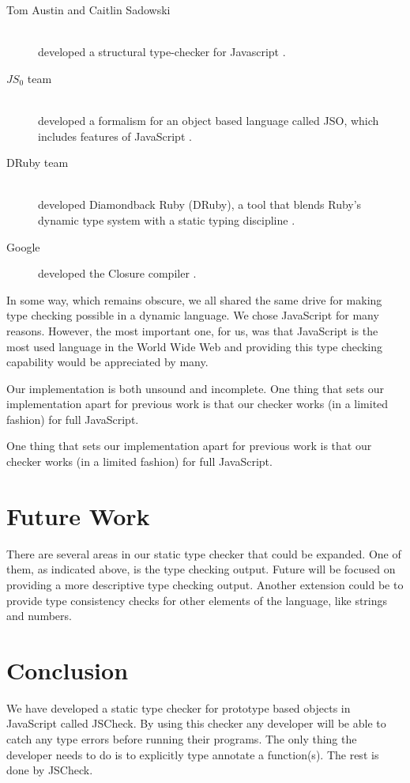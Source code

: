 \documentclass{article}
\begin{document}
\begin{description}
  \item[Tom Austin and Caitlin Sadowski] \hfill \\ 
  developed a structural type-checker for Javascript \cite{fwjsStruct}.
  \item[$JS_0$ team] \hfill \\ 
  developed a formalism for an object based language called JSO, which includes features of JavaScript 
  \cite{typeinferenceforjavascriptEcoop,typecheckingforjavascript}. 
  \item[DRuby team] \hfill \\ 
  developed Diamondback Ruby (DRuby), a tool that blends Ruby's dynamic type 
  system with a static typing discipline \cite{typecheckingruby}.
  \item[Google] developed the Closure compiler \cite{closureCompiler}.  
\end{description}

In some way, which remains obscure, we all shared the same drive for making type 
checking possible in a dynamic language. We chose JavaScript for many reasons. 
However, the most important one, for us, was that JavaScript is the most used 
language in the World Wide Web and providing this type checking capability would
be appreciated by many. 

Our implementation is both unsound and incomplete. One thing that sets our 
implementation apart for previous work is that our checker works (in a limited 
fashion) for full JavaScript.

One thing that sets our 
implementation apart for previous work is that our checker works (in a limited fashion) for
full JavaScript.

\section{Future Work}
\label{sec:future}
There are several areas in our static type checker that could be expanded. One of
them, as indicated above, is the type checking output. Future will be focused on 
providing a more descriptive type checking output. Another extension could be to
provide type consistency checks for other elements of the language, like strings
and numbers.



\section{Conclusion}
\label{sec:conclusion}
We have developed a static type checker for prototype based objects in JavaScript
called JSCheck. By using this checker any developer will be able to catch any 
type errors before running their programs. The only thing the developer needs to
do is to explicitly type annotate a function(s). The rest is done by JSCheck. 
\end{document}
